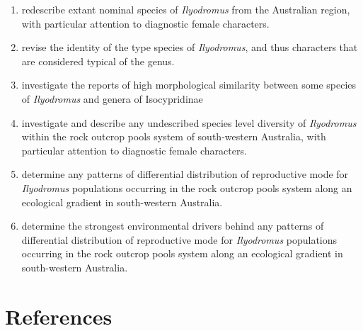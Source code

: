 \begin{enumerate}
\item
redescribe extant nominal species of \textit{Ilyodromus} from the Australian region, with particular attention to diagnostic female characters.
\item
revise the identity of the type species of \textit{Ilyodromus}, and thus characters that are considered typical of the genus.
\item
investigate the reports of high morphological similarity between some species of \textit{Ilyodromus} and genera of Isocypridinae
\item
investigate and describe any undescribed species level diversity of \textit{Ilyodromus} within the rock outcrop pools system of south-western Australia, with particular attention to diagnostic female characters.
\item
determine any patterns of differential distribution of reproductive mode for \textit{Ilyodromus} populations occurring in the rock outcrop pools system along an ecological gradient in south-western Australia.
\item
determine the strongest environmental drivers behind any patterns of differential distribution of reproductive mode for \textit{Ilyodromus} populations occurring in the rock outcrop pools system along an ecological gradient in south-western Australia.
\end{enumerate}

\section{References}
\sloppy
\printbibliography[heading=none]
\fussy

